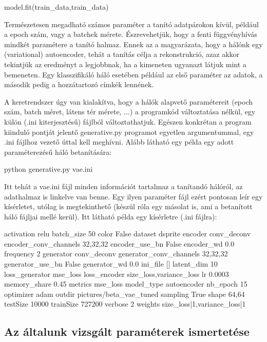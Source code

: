 \begin{python}
model.fit(train_data,train_data)
\end{python}

Természetesen megadható számos paraméter a tanító adatpárokon kívül, például a epoch szám, vagy a batchek mérete. Észrevehetjük, hogy a fenti függvényhívás mindkét paramétere a tanító halmaz. Ennek az a magyarázata, hogy a hálónk egy (variational) autoencoder, tehát a tanítás célja a rekonstrukció, azaz akkor tekintjük az eredményt a legjobbnak, ha a kimeneten ugyanazt látjuk mint a bemeneten. Egy klasszifikáló háló esetében például az első paraméter az adatok, a második pedig a hozzátartozó címkék lennének.

A keretrendszer úgy van kialakítva, hogy a hálók alapvető paramétereit (epoch szám, batch méret, látens tér mérete, $\dots$) a programkód változtatása nélkül, egy külön (.ini kiterjesztésű) fájlból változtathatjuk. Egészen konkrétan a program kiinduló pontját jelentő generative.py programot egyetlen argumentummal, egy .ini fájlhoz vezető úttal kell meghívni. Alább látható egy példa egy adott paraméterezésű háló betanítására:


\lstset{language=sh}
\begin{python}
python generative.py vae.ini
\end{python}

Itt tehát a vae.ini fájl minden információt tartalmaz a tanítandó hálóról, az adathalmaz is linkelve van benne. Egy ilyen paraméter fájl ezért pontosan leír egy kísérletet, utólag is megtekinthető (készül róla egy másolat is, ami a betanított háló fájljai mellé kerül). Itt látható példa egy kísérletre (.ini fájlra):

\begin{python}
activation	relu
batch_size	50
color	False
dataset	dsprite
encoder	conv_deconv
encoder_conv_channels   32,32,32
encoder_use_bn	False
encoder_wd	0.0
frequency	2
generator	conv_deconv
generator_conv_channels   32,32,32
generator_use_bn	False
generator_wd	0.0
ini_file	[]
latent_dim	10
loss_generator  mse_loss
loss_encoder    size_loss,variance_loss
lr	0.0003
memory_share	0.45
metrics	mse_loss
model_type	autoencoder
nb_epoch	15
optimizer	adam
outdir	pictures/beta_vae_tuned
sampling	True
shape	64,64
testSize	10000
trainSize	727200
verbose	2
weights size_loss|1,variance_loss|1
\end{python}


\subsection{Az általunk vizsgált paraméterek ismertetése}

